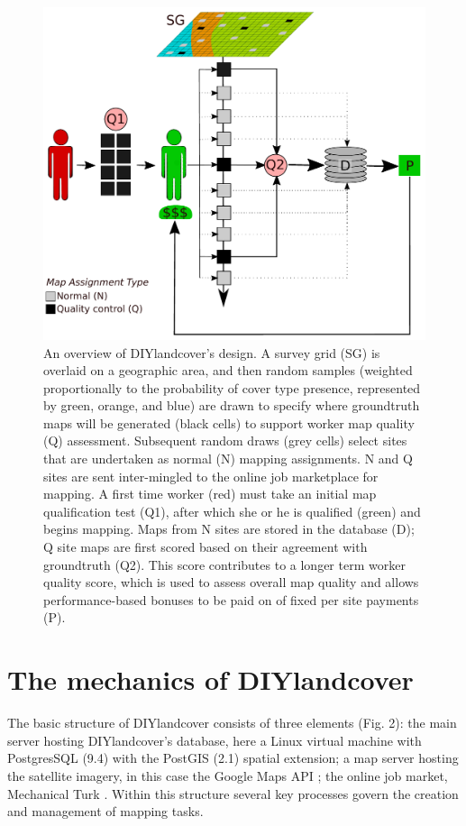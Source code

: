 \documentclass[preprint,12pt,authoryear]{elsarticle}
\begin{document}
\begin{figure}[!ht]
  \begin{center}
    \includegraphics[scale=0.6]{figures/fig1.pdf}
    \caption{An overview of DIYlandcover's design. A survey grid (SG) is overlaid on a geographic area, and then random samples (weighted proportionally to the probability of cover type presence, represented by green, orange, and blue) are drawn to specify where groundtruth maps will be generated (black cells) to support worker map quality (Q) assessment. Subsequent random draws (grey cells) select sites that are undertaken as normal (N) mapping assignments. N and Q sites are sent inter-mingled to the online job marketplace for mapping. A first time worker (red) must take an initial map qualification test (Q1), after which she or he is qualified (green) and begins mapping. Maps from N sites are stored in the database (D); Q site maps are first scored based on their agreement with groundtruth (Q2). This score contributes to a longer term worker quality score, which is used to assess overall map quality and allows performance-based bonuses to be paid on of fixed per site payments (P).}
    \label{default}
  \end{center}
\end{figure}

\section{The mechanics of DIYlandcover}
The basic structure of DIYlandcover consists of three elements (Fig. 2): the main server hosting DIYlandcover's  database, here a Linux virtual machine with PostgresSQL (9.4) with the PostGIS (2.1) spatial extension;  a map server hosting the satellite imagery, in this case the Google Maps API \citep{google_developers_google_2012}; the online job market, Mechanical Turk \citep{amazon_web_services_amazon_2012}. Within this structure several key processes govern the creation and management of mapping tasks.  
\end{document}
